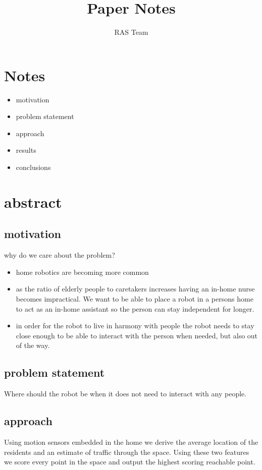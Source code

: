 \documentclass[12pt,a4paper]{article}
\author{RAS Team}
\title{Paper Notes}
\begin{document}
\maketitle

\section{Notes}
\begin{itemize}
    \item motivation 
    \item problem statement
    \item approach
    \item results
    \item conclusions
\end{itemize}

\section{abstract}

\subsection{motivation}
why do we care about the problem?
\begin{itemize}
    \item home robotics are becoming more common
    \item as the ratio of elderly people to caretakers increases having an in-home nurse becomes impractical. We want to be able to place a robot in a persons home to act as an in-home assistant so the person can stay independent for longer.
    \item in order for the robot to live in harmony with people the robot needs to stay close enough to be able to interact with the person when needed, but also out of the way.
\end{itemize}

\subsection{problem statement}
Where should the robot be when it does not need to interact with any people.

\subsection{approach}
Using motion sensors embedded in the home we derive the average location of the residents and an estimate of traffic through the space. Using these two features we score every point in the space and output the highest scoring reachable point.
\end{document}

